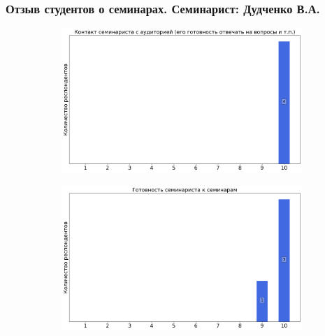     \subsubsection{Отзыв студентов о семинарах. Семинарист: Дудченко В.А.}
        \begin{figure}[H]
            \centering
            \begin{subfigure}[b]{0.45\textwidth}
                \centering
                \includegraphics[width=\textwidth]{images/3 course/Теория поля/seminarists-marks-Дудченко В.А.-0.png}
            \end{subfigure}
            \begin{subfigure}[b]{0.45\textwidth}
                \centering
                \includegraphics[width=\textwidth]{images/3 course/Теория поля/seminarists-marks-Дудченко В.А.-1.png}
            \end{subfigure}
            \begin{subfigure}[b]{0.45\textwidth}
                \centering

\end{subfigure}
\end{figure}
